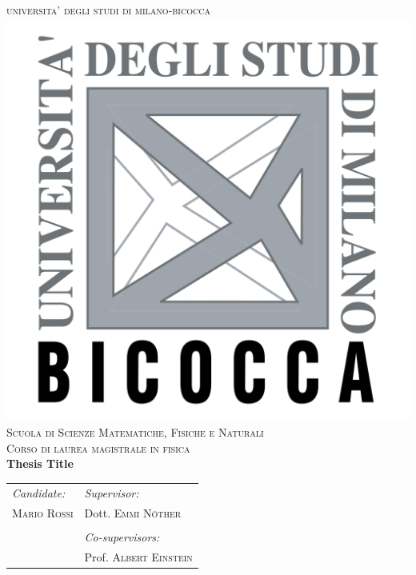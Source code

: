 \documentclass[a4]{article}
\begin{document}
\begin{titlepage}

\newcommand{\HRule}{\rule{\linewidth}{0.5mm}} %

\center %
 
{ 
\textsc{\LARGE universita' degli studi di milano-bicocca}\\[1cm] %
}
\includegraphics[width = .25\textwidth]{logo_unimib.png}\\[1cm] %
\textsc{\Large Scuola di Scienze Matematiche, Fisiche e Naturali }\\[0.25cm] %
\textsc{\large Corso di laurea magistrale in fisica}\\[0.75cm] %


\vspace{1.5cm}
{ 
{\huge \bfseries Thesis Title }\\[0.4cm] %
}
\vspace{4cm}
 
\begin{table}[htb!]
\centering
\begin{tabularx}{\textwidth}{X X}
\emph{Candidate:} & \emph{Supervisor:} \\
\textsc{Mario Rossi} & Dott. \textsc{Emmi N\"other}  \\
& \\
& \emph{Co-supervisors:} \\
& Prof. \textsc{Albert Einstein} \\
\end{tabularx}
\end{table}


\end{titlepage}
\end{document}
